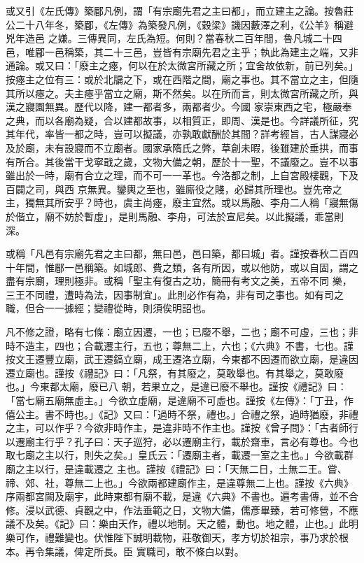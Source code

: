 \begin{pinyinscope}
 或又引《左氏傳》築郿凡例，謂「有宗廟先君之主曰都」，而立建主之論。按魯莊公二十八年冬，築郿，《左傳》為築發凡例，《穀梁》譏因藪澤之利，《公羊》稱避兇年造邑
 之嫌。三傳異同，左氏為短。何則？當春秋二百年間，魯凡城二十四邑，唯郿一邑稱築，其二十三邑，豈皆有宗廟先君之主乎；執此為建主之端，又非通論。或又曰：「廢主之瘞，何以在於太微宮所藏之所；宜舍故依新，前已列矣。」按瘞主之位有三：或於北牖之下，或在西階之間，廟之事也。其不當立之主，但隨其所以瘞之。夫主瘞乎當立之廟，斯不然矣。以在所而言，則太微宮所藏之所，與漢之寢園無異。歷代以降，建一都者多，兩都者少。今國
 家崇東西之宅，極嚴奉之典，而以各廟為疑，合以建都故事，以相質正，即周、漢是也。今詳議所征，究其年代，率皆一都之時，豈可以擬議，亦孰敢獻酬於其間？詳考經旨，古人謀寢必及於廟，未有設寢而不立廟者。國家承隋氏之弊，草創未暇，後雖建於垂拱，而事有所合。其後當干戈寧戢之歲，文物大備之朝，歷於十一聖，不議廢之。豈不以事雖出於一時，廟有合立之理，而不可一一革也。今洛都之制，上自宮殿樓觀，下及百闢之司，與西
 京無異。鑾輿之至也，雖廝役之賤，必歸其所理也。豈先帝之主，獨無其所安乎？時也，虞主尚瘞，廢主宜然。或以馬融、李舟二人稱「寢無傷於偕立，廟不妨於暫虛」，是則馬融、李舟，可法於宣尼矣。以此擬議，乖當則深。



 或稱「凡邑有宗廟先君之主曰都，無曰邑，邑曰築，都曰城」者。謹按春秋二百四十年間，惟郿一邑稱築。如城郎、費之類，各有所因，或以他防，或以自固，謂之盡有宗廟，理則極非。或稱「聖主有復古之功，簡冊有考文之美，五帝不同
 樂，三王不同禮，遭時為法，因事制宜」。此則必作有為，非有司之事也。如有司之職，但合一一據經；變禮從時，則須俟明詔也。



 凡不修之證，略有七條：廟立因遷，一也；已廢不舉，二也；廟不可虛，三也；非時不造主，四也；合載遷主行，五也；尊無二上，六也；《六典》不書，七也。謹按文王遷豐立廟，武王遷鎬立廟，成王遷洛立廟，今東都不因遷而欲立廟，是違因遷立廟也。謹按《禮記》曰：「凡祭，有其廢之，莫敢舉也。有其舉之，莫敢廢也。」今東都太廟，廢已八
 朝，若果立之，是違已廢不舉也。謹按《禮記》曰：「當七廟五廟無虛主。」今欲立虛廟，是違廟不可虛也。謹按《左傳》：「丁丑，作僖公主。書不時也。」《記》又曰：「過時不祭，禮也。」合禮之祭，過時猶廢，非禮之主，可以作乎？今欲非時作主，是違非時不作主也。謹按《曾子問》：「古者師行以遷廟主行乎？孔子曰：天子巡狩，必以遷廟主行，載於齋車，言必有尊也。今也取七廟之主以行，則失之矣。」皇氏云：「遷廟主者，載遷一室之主也。」今欲載群廟之主以行，是違載遷之
 主也。謹按《禮記》曰：「天無二日，土無二王。嘗、禘、郊、社，尊無二上也。」今欲兩都建廟作主，是違尊無二上也。謹按《六典》序兩都宮闕及廟宇，此時東都有廟不載，是違《六典》不書也。遍考書傳，並不合修。浸以武德、貞觀之中，作法垂範之日，文物大備，儒彥畢臻，若可修營，不應議不及矣。《記》曰：樂由天作，禮以地制。天之體，動也。地之體，止也。」此明樂可作，禮難變也。伏惟陛下誠明載物，莊敬御天，孝方切於祖宗，事乃求於根本。再令集議，俾定所長。臣
 實職司，敢不條白以對。




\end{pinyinscope}
